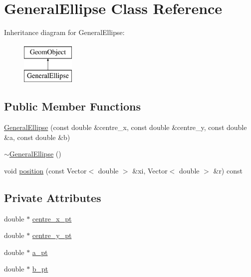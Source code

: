 \hypertarget{classGeneralEllipse}{}\section{General\+Ellipse Class Reference}
\label{classGeneralEllipse}
Inheritance diagram for General\+Ellipse\+:\begin{figure}[H]
\begin{center}
\leavevmode
\includegraphics[height=2.000000cm]{classGeneralEllipse}
\end{center}
\end{figure}
\subsection*{Public Member Functions}
\begin{DoxyCompactItemize}
\item 
\hyperlink{classGeneralEllipse_a50dc036d709bcd1d53eafb62b5548f67}{General\+Ellipse} (const double \&centre\+\_\+x, const double \&centre\+\_\+y, const double \&a, const double \&b)
\item 
\hyperlink{classGeneralEllipse_a3ac5c17cf8c4998f1b74913860cb3bb9}{$\sim$\+General\+Ellipse} ()
\item 
void \hyperlink{classGeneralEllipse_a85e975c70441a9c9c711b5e27d124bff}{position} (const Vector$<$ double $>$ \&xi, Vector$<$ double $>$ \&r) const
\end{DoxyCompactItemize}
\subsection*{Private Attributes}
\begin{DoxyCompactItemize}
\item 
double $\ast$ \hyperlink{classGeneralEllipse_a94a4648c20c4a51e2e9599634e32f9f1}{centre\+\_\+x\+\_\+pt}
\item 
double $\ast$ \hyperlink{classGeneralEllipse_a64b87c57aa9b725a9099fb64aa2586dd}{centre\+\_\+y\+\_\+pt}
\item 
double $\ast$ \hyperlink{classGeneralEllipse_ab7accdeac49aacf9f6a1b2fc935e9692}{a\+\_\+pt}
\item 
double $\ast$ \hyperlink{classGeneralEllipse_ae9fda2830674311985eaf2fddeeec1e3}{b\+\_\+pt}
\end{DoxyCompactItemize}


